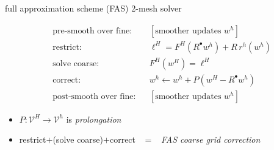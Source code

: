 \documentclass[svgnames,
               hyperref={colorlinks,citecolor=DeepPink4,linkcolor=FireBrick,urlcolor=Maroon},
               usepdftitle=false]  %
               {beamer}
\newcommand{\iR}{R^{\bullet}}
\begin{document}
\begin{frame}{full approximation scheme (FAS) 2-mesh solver}

\begin{align*}
&\text{pre-smooth over fine:} & & [\text{smoother updates } w^h] \\
&\text{restrict:}                   & &\ell^H = F^H(\iR w^h) + R\, r^h(w^h) \\
&\text{solve coarse:}                      & &F^H(w^H) = \ell^H \\
&\text{correct}:                    & &w^h \leftarrow w^h + P(w^H - \iR w^h) \\
&\text{post-smooth over fine:} & & [\text{smoother updates } w^h]
\end{align*}

\bigskip
{\small
\begin{itemize}
\item $P: \mathcal{V}^H \to \mathcal{V}^h$ is \emph{prolongation}
\item restrict$+$(solve coarse)$+$correct \, $=$ \, \emph{FAS coarse grid correction}
\end{itemize}
}
\end{frame}
\end{document}
